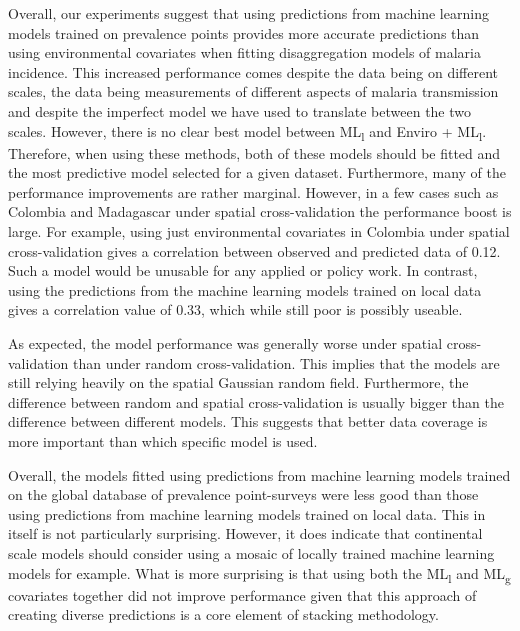 \documentclass[11pt]{article}
\begin{document}
Overall, our experiments suggest that using predictions from machine learning models trained on prevalence points provides more accurate predictions than using environmental covariates when fitting disaggregation models of malaria incidence.
This increased performance comes despite the data being on different scales, the data being measurements of different aspects of malaria transmission and despite the imperfect model we have used to translate between the two scales.
However, there is no clear best model between ML\textsubscript{l} and Enviro + ML\textsubscript{l}.
Therefore, when using these methods, both of these models should be fitted and the most predictive model selected for a given dataset.
Furthermore, many of the performance improvements are rather marginal. 
However, in a few cases such as Colombia and Madagascar under spatial cross-validation the performance boost is large.
For example, using just environmental covariates in Colombia under spatial cross-validation gives a correlation between observed and predicted data of 0.12.
Such a model would be unusable for any applied or policy work.
In contrast, using the predictions from the machine learning models trained on local data gives a correlation value of 0.33, which while still poor is possibly useable.

As expected, the model performance was generally worse under spatial cross-validation than under random cross-validation.
This implies that the models are still relying heavily on the spatial Gaussian random field.
Furthermore, the difference between random and spatial cross-validation is usually bigger than the difference between different models.
This suggests that better data coverage is more important than which specific model is used.






Overall, the models fitted using predictions from machine learning models trained on the global database of prevalence point-surveys were less good than those using predictions from machine learning models trained on local data.
This in itself is not particularly surprising.
However, it does indicate that continental scale models should consider using a mosaic of locally trained machine learning models for example.
What is more surprising is that using both the ML\textsubscript{l} and ML\textsubscript{g} covariates together did not improve performance given that this approach of creating diverse predictions is a core element of stacking methodology.
\end{document}
